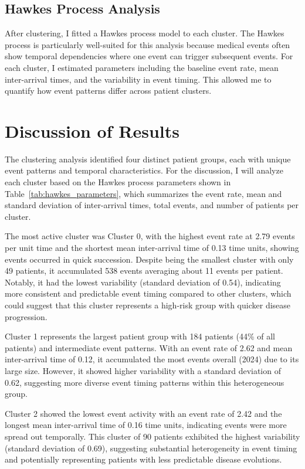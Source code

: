 \documentclass[a4paper,12pt]{article}
\begin{document}
\subsection{Hawkes Process Analysis}

After clustering, I fitted a Hawkes process model to each cluster. The Hawkes process is particularly well-suited for this analysis because medical events often show temporal dependencies where one event can trigger subsequent events. For each cluster, I estimated parameters including the baseline event rate, mean inter-arrival times, and the variability in event timing. This allowed me to quantify how event patterns differ across patient clusters.

\section{Discussion of Results}

The clustering analysis identified four distinct patient groups, each with unique event patterns and temporal characteristics. For the discussion, I will analyze each cluster based on the Hawkes process parameters shown in Table~\ref{tab:hawkes_parameters}, which summarizes the event rate, mean and standard deviation of inter-arrival times, total events, and number of patients per cluster.

\vspace{0.5cm}
\noindent
The most active cluster was Cluster 0, with the highest event rate at 2.79 events per unit time and the shortest mean inter-arrival time of 0.13 time units, showing events occurred in quick succession. Despite being the smallest cluster with only 49 patients, it accumulated 538 events averaging about 11 events per patient. Notably, it had the lowest variability (standard deviation of 0.54), indicating more consistent and predictable event timing compared to other clusters, which could suggest that this cluster represents a high-risk group with quicker disease progression.

\noindent
Cluster 1 represents the largest patient group with 184 patients (44\% of all patients) and intermediate event patterns. With an event rate of 2.62 and mean inter-arrival time of 0.12, it accumulated the most events overall (2024) due to its large size. However, it showed higher variability with a standard deviation of 0.62, suggesting more diverse event timing patterns within this heterogeneous group.

\noindent
Cluster 2 showed the lowest event activity with an event rate of 2.42 and the longest mean inter-arrival time of 0.16 time units, indicating events were more spread out temporally. This cluster of 90 patients exhibited the highest variability (standard deviation of 0.69), suggesting substantial heterogeneity in event timing and potentially representing patients with less predictable disease evolutions.
\end{document}
